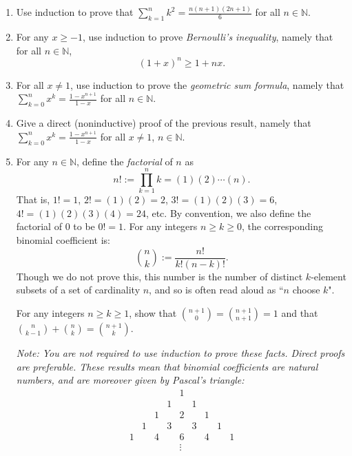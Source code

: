 \documentclass[12 pt,letterpaper]{article}
\newcommand{\bbN}{\mathbb{N}}
\begin{document}
\begin{enumerate}
\newpage
\item
Use induction to prove that
$\displaystyle\sum_{k=1}^{n}k^2=\tfrac{n(n+1)(2n+1)}{6}$ for all $n\in\bbN$.

\item
For any $x\geq -1$,
use induction to prove \textit{Bernoulli's inequality},
namely that for all $n\in\bbN$,
\begin{equation*}
(1+x)^n\geq 1+nx.
\end{equation*}

\item
For all $x\neq 1$,
use induction to prove the \textit{geometric sum formula},
namely that $\displaystyle\sum_{k=0}^{n}x^k=\tfrac{1-x^{n+1}}{1-x}$ for all $n\in\bbN$.

\item
Give a direct (noninductive) proof of the previous result,
namely that $\displaystyle\sum_{k=0}^{n}x^k=\tfrac{1-x^{n+1}}{1-x}$ for all $x\neq1$, $n\in\bbN$.

\item
For any $n\in\bbN$, define the \textit{factorial} of $n$ as
\begin{equation*}
n!:=\prod_{k=1}^{n}k=(1)(2)\cdots(n).
\end{equation*}
That is, $1!=1$, $2!=(1)(2)=2$, $3!=(1)(2)(3)=6$, $4!=(1)(2)(3)(4)=24$, etc.
By convention, we also define the factorial of $0$ to be $0!=1$.
For any integers $n\geq k\geq0$,
the corresponding binomial coefficient is:
\begin{equation*}
\binom{n}{k}
:=\frac{n!}{k!(n-k)!}.
\end{equation*}
Though we do not prove this,
this number is the number of distinct $k$-element subsets of a set of cardinality $n$,
and so is often read aloud as ``$n$ choose $k$".

For any integers $n\geq k\geq 1$,
show that $\displaystyle\binom{n+1}{0}=\binom{n+1}{n+1}=1$ and that $\displaystyle\binom{n}{k-1}+\binom{n}{k}=\binom{n+1}{k}$.\medskip

\textit{Note:
You are not required to use induction to prove these facts.
Direct proofs are preferable.
These results mean that binomial coefficients are natural numbers, and are moreover given by Pascal's triangle:}
\begin{equation*}
\begin{array}{ccccccccc}
 & & & &1& & & & \\
 & & &1& &1& & & \\
 & &1& &2& &1& & \\
 &1& &3& &3& &1& \\
1& &4& &6& &4& &1\\
 & & & &\vdots
\end{array}
\end{equation*}


\end{enumerate}
\end{document}
